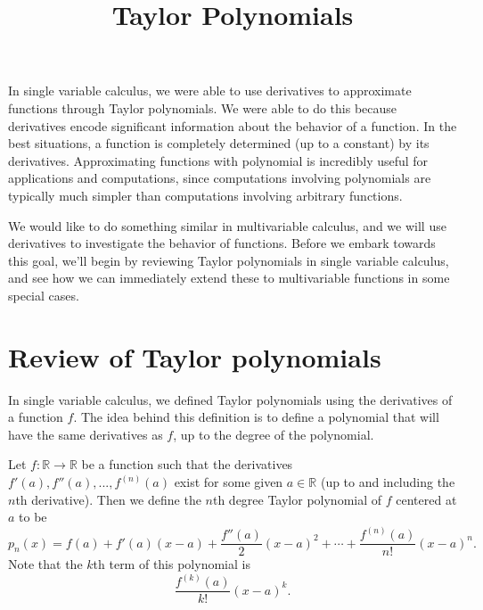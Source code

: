 \documentclass{ximera}
\title{Taylor Polynomials}
\begin{document}
\begin{abstract}
\end{abstract}
\maketitle

In single variable calculus, we were able to use derivatives to approximate functions through Taylor polynomials. We were able to do this because derivatives encode significant information about the behavior of a function. In the best situations, a function is completely determined (up to a constant) by its derivatives. Approximating functions with polynomial is incredibly useful for applications and computations, since computations involving polynomials are typically much simpler than computations involving arbitrary functions. 

We would like to do something similar in multivariable calculus, and we will use derivatives to investigate the behavior of functions. Before we embark towards this goal, we'll begin by reviewing Taylor polynomials in single variable calculus, and see how we can immediately extend these to multivariable functions in some special cases.

\section*{Review of Taylor polynomials}

In single variable calculus, we defined Taylor polynomials using the derivatives of a function $f$. The idea behind this definition is to define a polynomial that will have the same derivatives as $f$, up to the degree of the polynomial.

\begin{definition}
Let $f:\mathbb{R}\rightarrow\mathbb{R}$ be a function such that the derivatives $f'(a),f''(a),...,f^{(n)}(a)$ exist for some given $a\in\mathbb{R}$ (up to and including the $n$th derivative). Then we define the $n$th degree Taylor polynomial of $f$ centered at $a$ to be
\[
p_n(x)=f(a) + f'(a)(x-a) + \frac{f''(a)}{2}(x-a)^2+\cdots + \frac{f^{(n)}(a)}{n!}(x-a)^n.
\]
Note that the $k$th term of this polynomial is
\[
\frac{f^{(k)}(a)}{k!}(x-a)^k.
\]
\end{definition}
\end{document}
